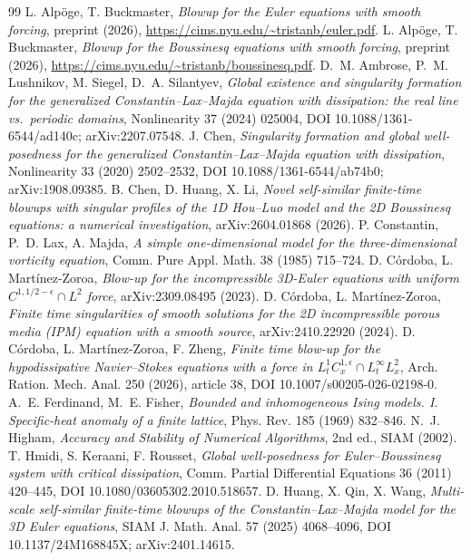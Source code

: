 \documentclass[11pt,a4paper]{article}
\theoremstyle{plain}
\theoremstyle{definition}
\begin{document}
\begin{thebibliography}{99}
 L. Alpöge, T. Buckmaster, \emph{Blowup for the Euler equations with smooth forcing}, preprint (2026), \url{https://cims.nyu.edu/~tristanb/euler.pdf}.
 L. Alpöge, T. Buckmaster, \emph{Blowup for the Boussinesq equations with smooth forcing}, preprint (2026), \url{https://cims.nyu.edu/~tristanb/boussinesq.pdf}.
 D.~M. Ambrose, P.~M. Lushnikov, M. Siegel, D.~A. Silantyev, \emph{Global existence and singularity formation for the generalized Constantin--Lax--Majda equation with dissipation: the real line vs.\ periodic domains}, Nonlinearity 37 (2024) 025004, DOI 10.1088/1361-6544/ad140c; arXiv:2207.07548.
 J. Chen, \emph{Singularity formation and global well-posedness for the generalized Constantin--Lax--Majda equation with dissipation}, Nonlinearity 33 (2020) 2502--2532, DOI 10.1088/1361-6544/ab74b0; arXiv:1908.09385.
 B. Chen, D. Huang, X. Li, \emph{Novel self-similar finite-time blowups with singular profiles of the 1D Hou--Luo model and the 2D Boussinesq equations: a numerical investigation}, arXiv:2604.01868 (2026).
 P. Constantin, P.~D. Lax, A. Majda, \emph{A simple one-dimensional model for the three-dimensional vorticity equation}, Comm. Pure Appl. Math. 38 (1985) 715--724.
 D. Córdoba, L. Martínez-Zoroa, \emph{Blow-up for the incompressible 3D-Euler equations with uniform $C^{1,1/2-\epsilon}\cap L^2$ force}, arXiv:2309.08495 (2023).
 D. Córdoba, L. Martínez-Zoroa, \emph{Finite time singularities of smooth solutions for the 2D incompressible porous media (IPM) equation with a smooth source}, arXiv:2410.22920 (2024).
 D. Córdoba, L. Martínez-Zoroa, F. Zheng, \emph{Finite time blow-up for the hypodissipative Navier--Stokes equations with a force in $L^1_tC^{1,\epsilon}_x\cap L^\infty_tL^2_x$}, Arch. Ration. Mech. Anal. 250 (2026), article 38, DOI 10.1007/s00205-026-02198-0.
 A.~E. Ferdinand, M.~E. Fisher, \emph{Bounded and inhomogeneous Ising models. I. Specific-heat anomaly of a finite lattice}, Phys. Rev. 185 (1969) 832--846.
 N.~J. Higham, \emph{Accuracy and Stability of Numerical Algorithms}, 2nd ed., SIAM (2002).
 T. Hmidi, S. Keraani, F. Rousset, \emph{Global well-posedness for Euler--Boussinesq system with critical dissipation}, Comm. Partial Differential Equations 36 (2011) 420--445, DOI 10.1080/03605302.2010.518657.
 D. Huang, X. Qin, X. Wang, \emph{Multi-scale self-similar finite-time blowups of the Constantin--Lax--Majda model for the 3D Euler equations}, SIAM J. Math. Anal. 57 (2025) 4068--4096, DOI 10.1137/24M168845X; arXiv:2401.14615.

\end{thebibliography}
\end{document}
